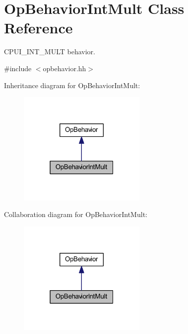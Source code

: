 \hypertarget{class_op_behavior_int_mult}{}\section{Op\+Behavior\+Int\+Mult Class Reference}
\label{class_op_behavior_int_mult}


C\+P\+U\+I\+\_\+\+I\+N\+T\+\_\+\+M\+U\+LT behavior.  




{\ttfamily \#include $<$opbehavior.\+hh$>$}



Inheritance diagram for Op\+Behavior\+Int\+Mult\+:
\nopagebreak
\begin{figure}[H]
\begin{center}
\leavevmode
\includegraphics[width=175pt]{class_op_behavior_int_mult__inherit__graph}
\end{center}
\end{figure}


Collaboration diagram for Op\+Behavior\+Int\+Mult\+:
\nopagebreak
\begin{figure}[H]
\begin{center}
\leavevmode
\includegraphics[width=175pt]{class_op_behavior_int_mult__coll__graph}
\end{center}
\end{figure}

